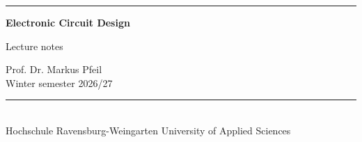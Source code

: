 \thispagestyle{empty}
\enlargethispage{10cm}
{\sffamily
\vspace*{-8mm}
\rwulogo[height=2.2cm]

\vspace*{6.5cm}
{\color{rwuviolet}\rule{\textwidth}{0.8mm}}

\vspace*{8mm}
{\fontsize{34}{40}\selectfont\bfseries\color{rwuviolet} Electronic Circuit Design}

\vspace*{4mm}
{\LARGE\color{rwucyandark} Lecture notes}
\ifdefined\onlychaptertitle

\vspace*{6mm}
{\LARGE\bfseries\color{rwuviolet} \onlychaptertitle}
\fi

\vspace*{12mm}
{\large Prof. Dr. Markus Pfeil}\\[1mm]

\vspace*{6mm}
{\large Winter semester 2026/27}

\vfill
{\color{rwucyan}\rule{\textwidth}{0.4mm}}\\[2mm]
{\small\color{rwugray} Hochschule Ravensburg-Weingarten University of Applied Sciences}
}
\newpage

